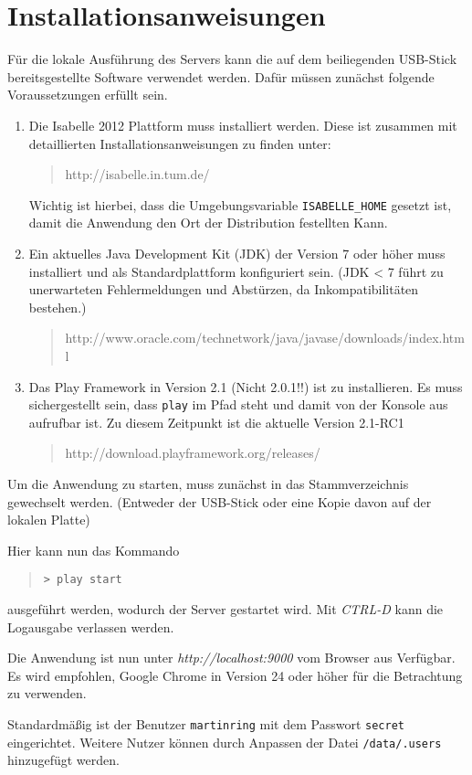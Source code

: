 \chapter{Installationsanweisungen}
\label{sec:install}

Für die lokale Ausführung des Servers kann die auf dem beiliegenden USB-Stick bereitsgestellte
Software verwendet werden. Dafür müssen zunächst folgende Voraussetzungen erfüllt sein.

\begin{enumerate}
  \item Die Isabelle 2012 Plattform muss installiert werden. Diese ist zusammen mit detaillierten 
  Installationsanweisungen zu finden unter:
  \begin{quote}
  http://isabelle.in.tum.de/
  \end{quote}
  Wichtig ist hierbei, dass die Umgebungsvariable \texttt{ISABELLE\_HOME} gesetzt ist, damit die 
  Anwendung den Ort der Distribution festellten Kann.
  \item Ein aktuelles Java Development Kit (JDK) der Version 7 oder höher muss installiert und als 
  Standardplattform konfiguriert sein. (JDK < 7 führt zu unerwarteten Fehlermeldungen und Abstürzen, 
  da Inkompatibilitäten bestehen.)
  \begin{quote}
  http://www.oracle.com/technetwork/java/javase/downloads/index.html
  \end{quote}
  \item Das Play Framework in Version 2.1 (Nicht 2.0.1!!) ist zu installieren. Es muss 
  sichergestellt sein, dass \texttt{play} im Pfad steht und damit von der Konsole aus aufrufbar ist. 
  Zu diesem Zeitpunkt ist die aktuelle Version 2.1-RC1
  \begin{quote}
  http://download.playframework.org/releases/
  \end{quote}
\end{enumerate}

Um die Anwendung zu starten, muss zunächst in das Stammverzeichnis gewechselt werden. (Entweder der
USB-Stick oder eine Kopie davon auf der lokalen Platte)

Hier kann nun das Kommando

\begin{quote}
\texttt{> play start}
\end{quote}

ausgeführt werden, wodurch der Server gestartet wird. Mit \textit{CTRL-D} kann die Logausgabe
verlassen werden.

Die Anwendung ist nun unter \textit{http://localhost:9000} vom Browser aus Verfügbar. Es wird
empfohlen, Google Chrome in Version 24 oder höher für die Betrachtung zu verwenden.

Standardmäßig ist der Benutzer \texttt{martinring} mit dem Passwort \texttt{secret} eingerichtet.
Weitere Nutzer können durch Anpassen der Datei \texttt{/data/.users} hinzugefügt werden.